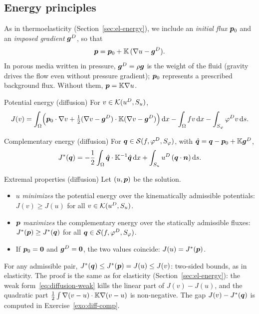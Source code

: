 \subsection{Energy principles}
%
As in thermoelasticity (Section~\ref{sec:el-energy}), we include an
\emph{initial flux} $\bm{p}_0$ and an \emph{imposed gradient} $\bm{g}^D$, so that
\[
  \bm{p}=\bm{p}_0+\mathbb{K}\,(\nabla u-\bm{g}^D).
\]
In porous media written in pressure, $\bm{g}^D=\rho\bm{g}$ is the weight of the
fluid (gravity drives the flow even without pressure gradient); $\bm{p}_0$
represents a prescribed background flux. Without them, $\bm{p}=\mathbb{K}\nabla u$.

\begin{gbox}{Potential energy (diffusion)}
For $v\in\mathcal{K}(u^{D},S_u)$,
\begin{equation}\label{eq:diffusion-energy}
  J(v)=\int_\Omega\Bigl(\bm{p}_0\cdot\nabla v
  +\tfrac12(\nabla v-\bm{g}^D)\cdot\mathbb{K}(\nabla v-\bm{g}^D)\Bigr)\,\mathrm{d} x
  -\int_\Omega fv\,\mathrm{d} x-\int_{S_\varphi}\varphi^{D} v\,\mathrm{d} s .
\end{equation}
\end{gbox}

\begin{gbox}{Complementary energy (diffusion)}
For $\bm{q}\in\mathcal{S}(f,\varphi^{D},S_\varphi)$, with $\hat{\bm{q}}=\bm{q}-\bm{p}_0+\mathbb{K}\bm{g}^D$,
\begin{equation}\label{eq:diffusion-comp}
  J^\ast(\bm{q})=-\frac12\int_\Omega\hat{\bm{q}}\cdot\mathbb{K}^{-1}\hat{\bm{q}}\,\mathrm{d} x
  +\int_{S_u}u^{D}\,(\bm{q}\cdot\bm{n})\,\mathrm{d} s .
\end{equation}
\end{gbox}

\begin{gbox}{Extremal properties (diffusion)}
Let $(u,\bm{p})$ be the solution.
\begin{itemize}
\item $u$ \emph{minimizes} the potential energy over the kinematically
admissible potentials: $J(v)\ge J(u)$ for all $v\in\mathcal{K}(u^{D},S_u)$.
\item $\bm{p}$ \emph{maximizes} the complementary energy over the statically
admissible fluxes: $J^\ast(\bm{p})\ge J^\ast(\bm{q})$ for all $\bm{q}\in\mathcal{S}(f,\varphi^{D},S_\varphi)$.
\item If $\bm{p}_0=\bm{0}$ and $\bm{g}^D=\bm{0}$, the two values coincide:
$J(u)=J^\ast(\bm{p})$.
\end{itemize}
\end{gbox}
For any admissible pair,
$J^\ast(\bm{q})\le J^\ast(\bm{p})=J(u)\le J(v)$: two-sided bounds, as in elasticity.
The proof is the same as for elasticity (Section~\ref{sec:el-energy}): the
weak form~\eqref{eq:diffusion-weak} kills the linear part of $J(v)-J(u)$, and
the quadratic part $\tfrac12\int\nabla(v-u)\cdot\mathbb{K}\nabla(v-u)$ is non-negative.
The gap $J(v)-J^\ast(\bm{q})$ is computed in Exercise~\ref{exo:diff-comp}.

